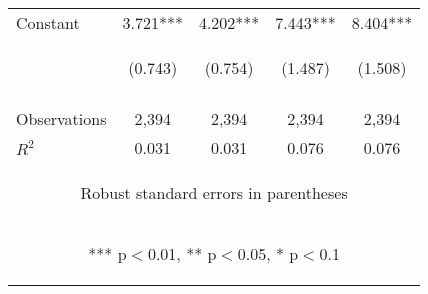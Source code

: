 \begin{center}
\begin{tabular}{lcccc}
Constant & 3.721*** & 4.202*** & 7.443*** & 8.404*** \\
 & \begin{footnotesize}(0.743)\end{footnotesize} & \begin{footnotesize}(0.754)\end{footnotesize} & \begin{footnotesize}(1.487)\end{footnotesize} & \begin{footnotesize}(1.508)\end{footnotesize} \\
\vspace{4pt} & \begin{footnotesize}\end{footnotesize} & \begin{footnotesize}\end{footnotesize} & \begin{footnotesize}\end{footnotesize} & \begin{footnotesize}\end{footnotesize} \\
Observations & 2,394 & 2,394 & 2,394 & 2,394 \\
 $R^2$ & 0.031 & 0.031 & 0.076 & 0.076 \\ \hline
\multicolumn{5}{c}{\begin{footnotesize} Robust standard errors in parentheses\end{footnotesize}} \\
\multicolumn{5}{c}{\begin{footnotesize} *** p$<$0.01, ** p$<$0.05, * p$<$0.1\end{footnotesize}} \\
\end{tabular}
\end{center}
